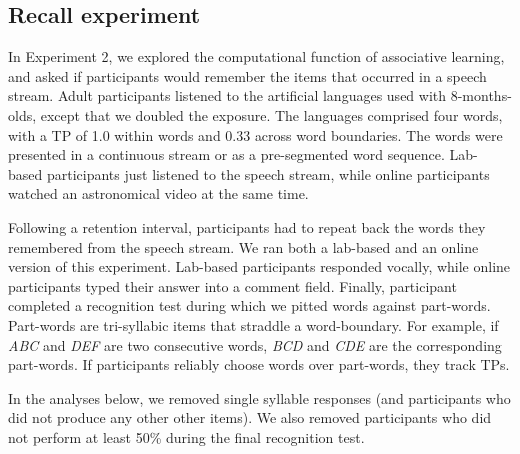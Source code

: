 \documentclass[
]{article}
\begin{document}
\clearpage

\hypertarget{recall-experiment-1}{%
\subsection{Recall experiment}\label{recall-experiment-1}}

In Experiment 2, we explored the computational function of associative
learning, and asked if participants would remember the items that
occurred in a speech stream. Adult participants listened to the
artificial languages \citet{Saffran-Science} used with 8-months-olds,
except that we doubled the exposure. The languages comprised four words,
with a TP of 1.0 within words and 0.33 across word boundaries. The words
were presented in a continuous stream or as a pre-segmented word
sequence. Lab-based participants just listened to the speech stream,
while online participants watched an astronomical video at the same
time.

Following a retention interval, participants had to repeat back the
words they remembered from the speech stream. We ran both a lab-based
and an online version of this experiment. Lab-based participants
responded vocally, while online participants typed their answer into a
comment field. Finally, participant completed a recognition test during
which we pitted words against part-words. Part-words are tri-syllabic
items that straddle a word-boundary. For example, if \emph{ABC} and
\emph{DEF} are two consecutive words, \emph{BCD} and \emph{CDE} are the
corresponding part-words. If participants reliably choose words over
part-words, they track TPs.

In the analyses below, we removed single syllable responses (and
participants who did not produce any other other items). We also removed
participants who did not perform at least 50\% during the final
recognition test.
\end{document}
